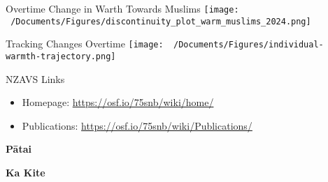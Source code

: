 \documentclass[
  ignorenonframetext,
  aspectratio=169,
]{beamer}
\providecommand{\tightlist}{%
  \setlength{\itemsep}{0pt}\setlength{\parskip}{0pt}}\usepackage{longtable,booktabs,array}
\begin{document}
\begin{frame}{Overtime Change in Warth Towards Muslims}
\label{overtime-change-in-warth-towards-muslims}
\texttt{[image: ~/Documents/Figures/discontinuity\_plot\_warm\_muslims\_2024.png]}
\end{frame}

\begin{frame}{Tracking Changes Overtime}
\label{tracking-changes-overtime}
\texttt{[image: ~/Documents/Figures/individual-warmth-trajectory.png]}
\end{frame}

\begin{frame}{NZAVS Links}
\label{nzavs-links}
\begin{itemize}
\tightlist
\item
  Homepage: \url{https://osf.io/75snb/wiki/home/}
\item
  Publications: \url{https://osf.io/75snb/wiki/Publications/}
\end{itemize}
\end{frame}

\begin{frame}
\textbf{Pātai}
\end{frame}

\begin{frame}
\textbf{Ka Kite}
\end{frame}
\end{document}
